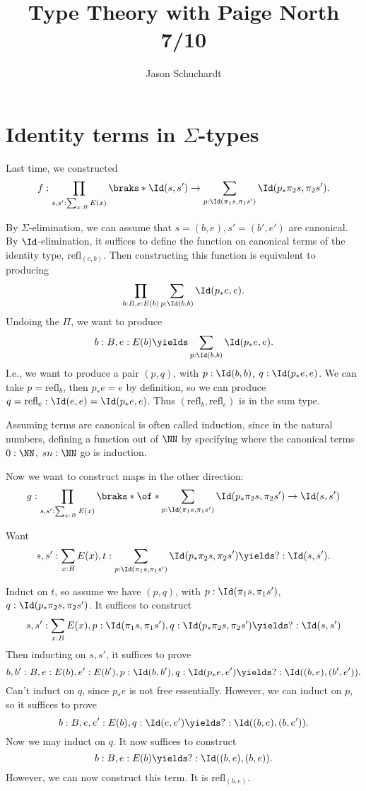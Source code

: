 \documentclass{article}
\title{Type Theory with Paige North 7/10}
\author{Jason Schuchardt}
\newcommand\refl{\mathrm{refl}}
\begin{document}
\maketitle

\section{Identity terms in $\Sigma$-types}

Last time, we constructed 
\[ f: \prod_{s,s':\sum_{x:B} E(x)}\braks*{
\Id(s,s') \to \sum_{p:\Id(\pi_1s,\pi_1s')}\Id(p_*\pi_2s,\pi_2s')
}.
\]

By $\Sigma$-elimination, we can assume that 
$s=(b,e),s'=(b',e')$ are canonical. By $\Id$-elimination, it 
suffices to define the function on canonical terms of the identity 
type, $\refl_{(e,b)}$. Then constructing this function is 
equivalent to producing
\[\prod_{b:B,e:E(b)} \sum_{p:\Id(b,b)} \Id(p_*e,e).\]
Undoing the $\Pi$, we want to produce
\[ b:B,e:E(b) \yields \sum_{p:\Id(b,b)} \Id(p_*e,e).\]
I.e., we want to produce a pair $(p,q)$, with $p:\Id(b,b)$,
$q:\Id(p_*e,e)$. We can take $p=\refl_b$, then $p_*e=e$ by 
definition, so we can produce $q=\refl_e:\Id(e,e)=\Id(p_*e,e)$.
Thus $(\refl_b,\refl_e)$ is in the sum type. 

Assuming terms are canonical is often called induction, since 
in the natural numbers, defining a function out of $\NN$
by specifying where the canonical terms $0:\NN$, $sn:\NN$ go
is induction.

Now we want to construct maps in the other direction:
\[g:\prod_{s,s':\sum_{x:B}E(x)} 
\braks*{
    \of*{
        \sum_{p:\Id(\pi_1s,\pi_1s')}\Id(p_*\pi_2s,\pi_2s')
    }\to 
    \Id(s,s')
}
\]

Want
\[ s,s' : \sum_{x:B} E(x), t:\sum_{p:\Id(\pi_1s,\pi_1s')}
\Id(p_*\pi_2s,\pi_2s')
\yields ? :\Id(s,s').
\]

Induct on $t$, so assume we have 
$(p,q)$, with $p:\Id(\pi_1s,\pi_1s')$, $q:\Id(p_*\pi_2s,\pi_2s')$.
It suffices to construct 
\[s,s':\sum_{x:B}E(x),
p:\Id(\pi_1s,\pi_1s'), q:\Id(p_*\pi_2s,\pi_2s')
\yields
?:\Id(s,s')
\]
Then inducting on $s,s'$, it suffices to prove 
\[
    b,b':B,e:E(b),e':E(b'),p:\Id(b,b'),q:\Id(p_*e,e')
    \yields ?:\Id((b,e),(b',e')).
\]
Can't induct on $q$, since $p_*e$ is not free essentially.
However, we can induct on $p$, so it suffices to prove 
\[
    b:B,e,e':E(b),q:\Id(e,e') \yields ? : \Id((b,e),(b,e')).
\]
Now we may induct on $q$. It now suffices to construct
\[
    b:B,e:E(b) \yields ? : \Id((b,e),(b,e)).
\]
However, we can now construct this term.
It is $\refl_{(b,e)}$.
\end{document}
